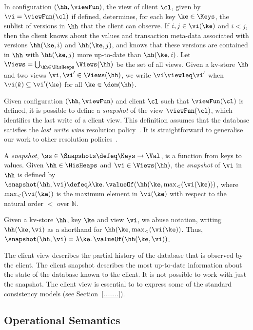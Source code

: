 In configuration $(\hh, \viewFun)$, the view of client 
$\cl$, given by $\vi = \viewFun(\cl)$ if defined,  determines, for each key $\ke
\in \Keys$, the sublist of versions in $\hh$
that the client can observe. If $i,j \in \vi(\ke)$ and $i < j$, then
the client knows about 
 the values and transaction meta-data associated with  versions
$\hh(\ke, i)$ and 
$\hh(\ke, j)$, and  knows that these versions are contained in 
 $\hh$ with  $\hh(\ke, j)$ more 
up-to-date than $\hh(\ke, i)$. 
Let $\Views = \bigcup_{\hh \in \HisHeaps} \Views(\hh)$ be the set of all views. 
Given a kv-store $\hh$ and two views $\vi, \vi' \in \Views(\hh)$, 
we write $\vi \viewleq \vi'$ when $\vi(k) \subseteq \vi'(\ke)$ for all $\ke \in \dom(\hh)$. 

Given configuration
$(\hh, \viewFun)$ and client $\cl$ such that $\viewFun(\cl)$ is
defined, it is possible to define a \emph{snapshot} of the
view $\viewFun  (\cl)$, which identifies the last write of a client
view. This definition assumes that the database satisfies the \emph{last write wins}
resolution policy~\cite{}. It  is straightforward to generalise our work
to other resolution policies~\cite{.}.

\begin{definition}[Snapshot]
\label{def:heaps}
\label{def:snapshot}
A \emph{snapshot}, \( \ss \in \Snapshots  \defeq \Keys \to
\Val\),  is a function  from keys to values.
Given $\hh \in \HisHeaps$ and $\vi \in \Views(\hh)$, the \emph{snapshot} of $\vi$ in 
$\hh$ is defined by  $\snapshot(\hh, \vi) \defeq \lambda \ke \ldotp \valueOf(\hh(\ke, \max_{<}(\vi(\ke)))$, 
where $\max_{<}(\vi(\ke))$ is the maximum element in $\vi(\ke)$ with respect to the natural 
order $<$ over $\mathbb{N}$.
\end{definition}
Given a kv-store $\hh$, key $\ke$ and view $\vi$, we abuse
notation, writing 
$\hh(\ke, \vi)$ as a shorthand for 
$\hh(\ke, \max_{<}(\vi(\ke))$. Thus, $\snapshot(\hh, \vi) = \lambda \ke \ldotp \valueOf(\hh(\ke, \vi))$. 

\begin{remark}
The client view describes the partial history of  the database that is
observed  by
the client. The client snapshot describes the most up-to-date
information about the state of the database known to the client. 
It is not possible to work with just the 
snapshot. The client view is essential to 
to express some of the standard consistency models (see
Section~\cref{........}). 
\end{remark}


\subsection{Operational Semantics}

